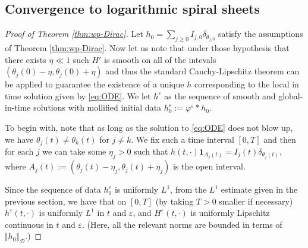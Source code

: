 \documentclass[10pt]{article}
\theoremstyle{definition}
\theoremstyle{remark}
\numberwithin{equation}{section}
\newcommand{\nrm}[1]{\Vert#1\Vert}
\newcommand{\0}{\emptyset}
\newcommand{\dlt}{\delta}
\newcommand{\tht}{\theta}
\newcommand{\varep}{\varepsilon}
\newcommand{\calD}{\mathcal D}
\begin{document}
	
	
	
	\subsection{Convergence to logarithmic spiral sheets}\label{sec:cvg moll}
	
	\begin{proof}[Proof of Theorem \ref{thm:wp-Dirac}]
		Let $h_0 = \sum_{j\ge0} I_{j,0}\dlt_{\tht_{j,0}}$ satisfy the assumptions of Theorem \ref{thm:wp-Dirac}. Now let us note that under those hypothesis that there exists $\eta\ll1 $ such $H'$ is smooth on all of the intevals $\left(\theta_j(0)-\eta,\theta_j(0)+\eta\right)$ and thus the standard Cauchy-Lipschitz theorem can be applied to guarantee the existence of a unique $h$ corresponding to the local in time solution given by \eqref{eq:ODE}. We let $h^\varep$ as the sequence of smooth and global-in-time solutions with mollified initial data $h^\varep_0 := \varphi^\varep * h_0$. 
		
		
		
		To begin with, note that as long as the solution to \eqref{eq:ODE} does not blow up, we have $\tht_{j}(t) \ne \tht_{k}(t)$ for $j\ne k$. We fix such a time interval $[0,T]$ and then for each $j$ we can take some $\eta_{j}>0$ such that $h(t,\cdot) \mathbf{1}_{A_{j}(t)} = I_{j}(t) \dlt_{\tht_j(t)}$, where $A_{j}(t):= (\tht_{j}(t) - \eta_{j}, \tht_{j}(t)+\eta_{j})$ is the open interval.  
		
		Since the sequence of data $h_0^{\varep}$ is uniformly $L^1$, from the $L^1$ estimate given in the previous section, we have that on $[0,T]$ (by taking $T>0$ smaller if necessary) $h^\varep(t,\cdot)$ is uniformly $L^1$ in $t$ and $\varep$, and $H^{\varep}(t,\cdot)$ is uniformly Lipschitz continuous in $t$ and $\varep$. (Here, all the relevant norms are bounded in terms of $\nrm{h_0}_{\calD}$.) 
		

\end{proof}
\end{document}
